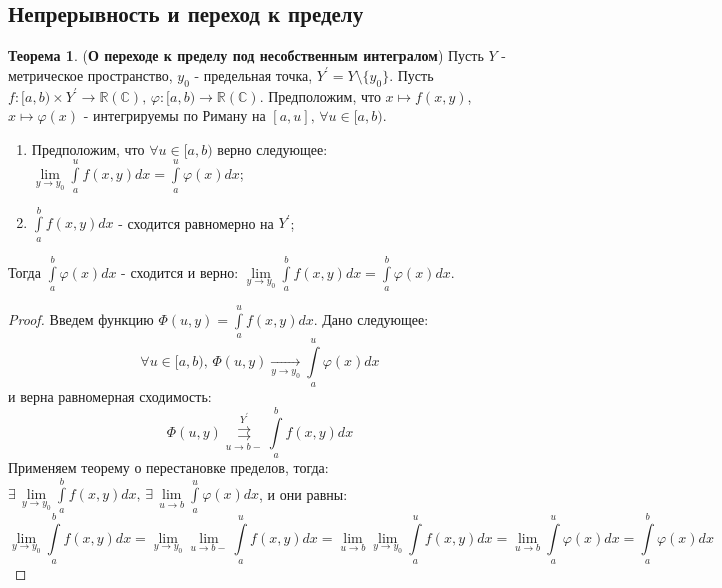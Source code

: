 \documentclass[12pt]{article}
\newcommand{\MR}{\mathbb{R}}
\newcommand{\MC}{\mathbb{C}}
\theoremstyle{definition}
\newtheorem{theorem}{Теорема}
\newcommand{\ddint}[2]{\displaystyle\int\limits_{#1}^{#2}}
\newcommand{\uconvm}[2]{\overset{#1}{\underset{#2}{\rightrightarrows}}}
\begin{document}
\subsection*{Непрерывность и переход к пределу}
\begin{theorem}(\textbf{О переходе к пределу под несобственным интегралом})
	Пусть $Y$ - метрическое пространство, $y_0$ - предельная точка, $Y^\prime = Y \setminus \{y_0\}$. Пусть $f\colon [a,b) \times Y^\prime \to \MR(\MC), \, \varphi \colon [a,b) \to \MR (\MC)$. Предположим, что $x \mapsto f(x,y)$, $x \mapsto \varphi(x)$ - интегрируемы по Риману на $[a,u], \, \forall u \in [a,b)$. 
	\begin{enumerate}[label=(\Roman*)]
		\item Предположим, что $\forall u \in [a,b)$ верно следующее: $\lim\limits_{y \to y_0}\ddint{a}{u}f(x,y)dx = \ddint{a}{u}\varphi(x)dx$;
		\item $\ddint{a}{b}f(x,y)dx$ - сходится равномерно на $Y^\prime$;
	\end{enumerate}
	Тогда $\ddint{a}{b}\varphi(x)dx$ - сходится и верно: $\lim\limits_{y \to y_0}\ddint{a}{b}f(x,y)dx = \ddint{a}{b}\varphi(x)dx$.
\end{theorem}
\begin{proof}
	Введем функцию $\Phi(u,y) = \ddint{a}{u}f(x,y)dx$. Дано следующее: 
	$$
		\forall u \in [a,b), \, \Phi(u,y) \xrightarrow[y \to y_0]{}\ddint{a}{u}\varphi(x)dx
	$$ 
	и верна равномерная сходимость:
	$$	
		\Phi(u,y) \uconvm{Y^\prime}{u \to b-}\ddint{a}{b}f(x,y)dx
	$$
	Применяем теорему о перестановке пределов, тогда: $\exists \, \lim\limits_{y \to y_0}\ddint{a}{b}f(x,y)dx, \, \exists \, \lim\limits_{u \to b}\ddint{a}{u}\varphi(x)dx$, и они равны:
	$$
		\lim\limits_{y \to y_0}\ddint{a}{b}f(x,y)dx = \lim\limits_{y \to y_0}\lim\limits_{u \to b-}\ddint{a}{u}f(x,y)dx= \lim\limits_{u \to b}\lim\limits_{y \to y_0}\ddint{a}{u}f(x,y)dx=   \lim\limits_{u \to b}\ddint{a}{u}\varphi(x)dx  = \ddint{a}{b}\varphi(x)dx
	$$
\end{proof}
\end{document}
